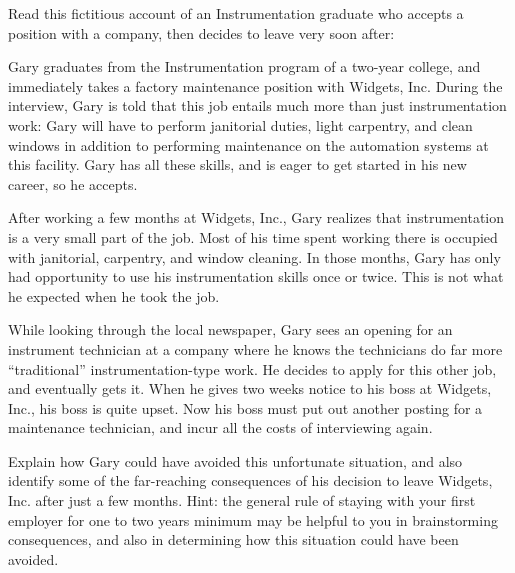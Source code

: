 

Read this fictitious account of an Instrumentation graduate who accepts a position with a company, then decides to leave very soon after:

\vskip 10pt {\narrower \noindent \baselineskip5pt

Gary graduates from the Instrumentation program of a two-year college, and immediately takes a factory maintenance position with Widgets, Inc.  During the interview, Gary is told that this job entails much more than just instrumentation work: Gary will have to perform janitorial duties, light carpentry, and clean windows in addition to performing maintenance on the automation systems at this facility.  Gary has all these skills, and is eager to get started in his new career, so he accepts.

After working a few months at Widgets, Inc., Gary realizes that instrumentation is a very small part of the job.  Most of his time spent working there is occupied with janitorial, carpentry, and window cleaning.  In those months, Gary has only had opportunity to use his instrumentation skills once or twice.  This is not what he expected when he took the job.

While looking through the local newspaper, Gary sees an opening for an instrument technician at a company where he knows the technicians do far more ``traditional'' instrumentation-type work.  He decides to apply for this other job, and eventually gets it.  When he gives two weeks notice to his boss at Widgets, Inc., his boss is quite upset.  Now his boss must put out another posting for a maintenance technician, and incur all the costs of interviewing again.

\par} \vskip 10pt

Explain how Gary could have avoided this unfortunate situation, and also identify some of the far-reaching consequences of his decision to leave Widgets, Inc. after just a few months.  Hint: the general rule of staying with your first employer for one to two years minimum may be helpful to you in brainstorming consequences, and also in determining how this situation could have been avoided.

\vfil

\eject





